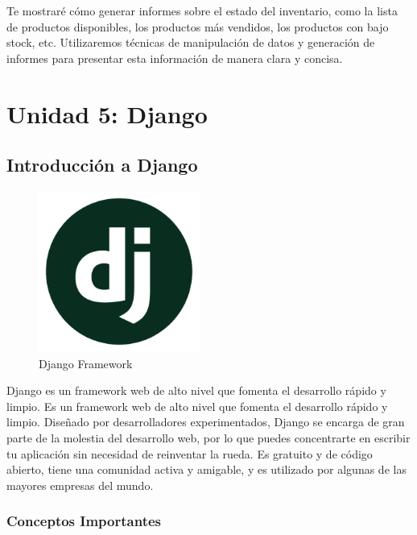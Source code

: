 \documentclass[
  a4paper,
  DIV=11,
  numbers=noendperiod,
  onepage,
  openany]{scrreprt}
\begin{document}
Te mostraré cómo generar informes sobre el estado del inventario, como
la lista de productos disponibles, los productos más vendidos, los
productos con bajo stock, etc. Utilizaremos técnicas de manipulación de
datos y generación de informes para presentar esta información de manera
clara y concisa.

\part{Unidad 5: Django}

\chapter{Introducción a Django}\label{introducciuxf3n-a-django}

\begin{figure}[H]

{\centering \includegraphics[width=2.08333in,height=\textheight]{images/django-logo.png}

}

\caption{Django Framework}

\end{figure}%

Django es un framework web de alto nivel que fomenta el desarrollo
rápido y limpio. Es un framework web de alto nivel que fomenta el
desarrollo rápido y limpio. Diseñado por desarrolladores experimentados,
Django se encarga de gran parte de la molestia del desarrollo web, por
lo que puedes concentrarte en escribir tu aplicación sin necesidad de
reinventar la rueda. Es gratuito y de código abierto, tiene una
comunidad activa y amigable, y es utilizado por algunas de las mayores
empresas del mundo.

\section{Conceptos Importantes}\label{conceptos-importantes}
\end{document}
